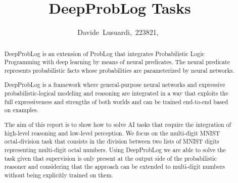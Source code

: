 \documentclass[journal]{IEEEtran}
\begin{document}
%
\title{DeepProbLog Tasks}
%
%
%

\author{Davide~Lusuardi,~223821,~%
}


\maketitle

\begin{abstract}
  DeepProbLog is an extension of ProbLog that integrates Probabilistic Logic Programming with deep learning by means of neural predicates. The neural predicate represents probabilistic facts whose probabilities are parameterized by neural networks.

  DeepProbLog is a framework where general-purpose neural networks and expressive probabilistic-logical modeling and reasoning are integrated in a way that exploits the full expressiveness and strengths of both worlds and can be trained end-to-end based on examples.

  The aim of this report is to show how to solve AI tasks that require the integration of high-level reasoning and low-level perception. We focus on the multi-digit MNIST octal-division task that consists in the division between two lists of MNIST digits representing multi-digit octal numbers. Using DeepProbLog we are able to solve the task given that supervision is only present at the output side of the probabilistic reasoner and considering that the approach can be extended to multi-digit numbers without being explicitly trained on them.  
\end{abstract}
\end{document}

